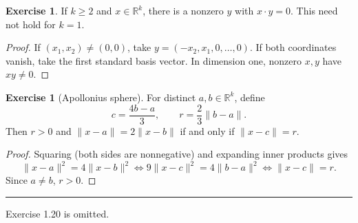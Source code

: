 \documentclass[12pt]{article}
\theoremstyle{definition}
\newtheorem{exercise}[theorem]{Exercise}
\newcommand{\R}{\mathbb R}
\newcommand{\norm}[1]{\lVert#1\rVert}
\begin{document}
\begin{exercise}
If $k\ge2$ and $x\in\R^k$, there is a nonzero $y$ with $x\cdot y=0$.
This need not hold for $k=1$.
\end{exercise}
\begin{proof}
If $(x_1,x_2)\ne(0,0)$, take
$y=(-x_2,x_1,0,\ldots,0)$.  If both coordinates vanish, take the first
standard basis vector.  In dimension one, nonzero $x,y$ have $xy\ne0$.
\end{proof}

\begin{exercise}[Apollonius sphere]
For distinct $a,b\in\R^k$, define
\[
 c=\frac{4b-a}{3},\qquad r=\frac23\norm{b-a}.
\]
Then $r>0$ and
$\norm{x-a}=2\norm{x-b}$ if and only if $\norm{x-c}=r$.
\end{exercise}
\begin{proof}
Squaring (both sides are nonnegative) and expanding inner products gives
\[
 \norm{x-a}^2=4\norm{x-b}^2
 \iff 9\norm{x-c}^2=4\norm{b-a}^2
 \iff \norm{x-c}=r.
\]
Since $a\ne b$, $r>0$.
\end{proof}

\bigskip\noindent\hrule\bigskip
Exercise 1.20 is omitted.
\end{document}
